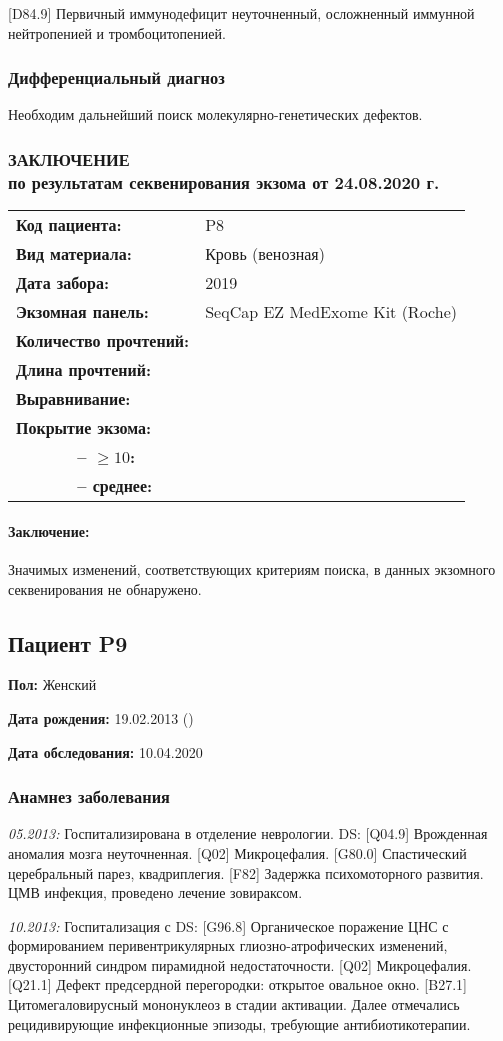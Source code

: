 \documentclass[a4paper,14pt]{extarticle}
\newcommand{\reportgen}[9]{
\begin{tabular}{ >{\bfseries}p{0.35\textwidth} l }
Код пациента: & #1 \\
Вид материала: & #2 \\
Дата забора: & #3 \\
Экзомная панель: & #4 \\
Количество прочтений: & \numprint[\mln]{#5} \\
Длина прочтений: & \numprint[bp]{#6} \\
Выравнивание: & \numprint[\%]{#7} \\
Покрытие экзома: & ~ \\
~~~~~~ -- $\geqslant10$: & \numprint[\%]{#8} \\
~~~~~~ -- среднее: & \numprint[прочтений/позицию]{#9} \\
\end{tabular}}
\newcommand{\mln}{млн}
\newcommand{\pdate}[1]{\emph{#1:} }
\newcommand{\DS}[2]{[#2] #1}
\begin{document}
\DS{Первичный иммунодефицит неуточненный, осложненный иммунной нейтропенией и тромбоцитопенией}{D84.9}.

\subsubsection*{Дифференциальный диагноз}

Необходим дальнейший поиск молекулярно-генетических дефектов.

\newpage
\subsubsection*{ЗАКЛЮЧЕНИЕ\\по результатам секвенирования экзома от 24.08.2020 г.}

\reportgen{P8}{Кровь (венозная)}{2019}{SeqCap EZ MedExome Kit (Roche)}{102}{150}{99.7}{72.1}{15}

\paragraph{Заключение:} Значимых изменений, соответствующих критериям поиска, в данных экзомного секвенирования не обнаружено.

\newpage
\subsection*{Пациент P9}

\textbf{Пол:} Женский

\textbf{Дата рождения:} 19.02.2013 ()

\textbf{Дата обследования:} 10.04.2020

\subsubsection*{Анамнез заболевания}

\pdate{05.2013} Госпитализирована в отделение неврологии. DS: \DS{Врожденная аномалия мозга неуточненная}{Q04.9}. \DS{Микроцефалия}{Q02}. \DS{Спастический церебральный парез, квадриплегия}{G80.0}. \DS{Задержка психомоторного развития}{F82}. ЦМВ инфекция, проведено лечение зовираксом.

\pdate{10.2013} Госпитализация с DS: \DS{Органическое поражение ЦНС с формированием перивентрикулярных глиозно-атрофических изменений, двусторонний синдром пирамидной недостаточности}{G96.8}. \DS{Микроцефалия}{Q02}. \DS{Дефект предсердной перегородки: открытое овальное окно}{Q21.1}. \DS{Цитомегаловирусный мононуклеоз в стадии активации}{B27.1}. 
Далее отмечались рецидивирующие инфекционные эпизоды, требующие антибиотикотерапии. 
\end{document}
